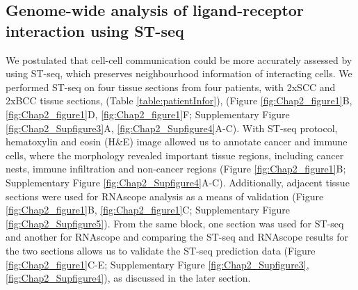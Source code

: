 \subsection{Genome-wide analysis of ligand-receptor interaction using ST-seq}
We postulated that cell-cell communication could be more accurately assessed by using ST-seq, which preserves neighbourhood information of interacting cells. We performed ST-seq on four tissue sections from four patients, with 2xSCC and 2xBCC tissue sections, (Table \ref{table:patientInfor}), (Figure \ref{fig:Chap2_figure1}B, \ref{fig:Chap2_figure1}D, \ref{fig:Chap2_figure1}F; Supplementary Figure \ref{fig:Chap2_Supfigure3}A, \ref{fig:Chap2_Supfigure4}A-C).  With ST-seq protocol, hematoxylin and eosin (H\&E) image allowed us to annotate cancer and immune cells, where the morphology revealed important tissue regions, including cancer nests, immune infiltration and non-cancer regions (Figure \ref{fig:Chap2_figure1}B; Supplementary Figure \ref{fig:Chap2_Supfigure4}A-C). Additionally, adjacent tissue sections were used for RNAscope analysis as a means of validation (Figure \ref{fig:Chap2_figure1}B, \ref{fig:Chap2_figure1}C; Supplementary Figure \ref{fig:Chap2_Supfigure5}).  From the same block, one section was used for ST-seq and another for RNAscope and comparing the ST-seq and RNAscope results for the two sections allows us to validate the ST-seq prediction data (Figure \ref{fig:Chap2_figure1}C-E; Supplementary Figure \ref{fig:Chap2_Supfigure3}, \ref{fig:Chap2_Supfigure4}), as discussed in the later section. 

